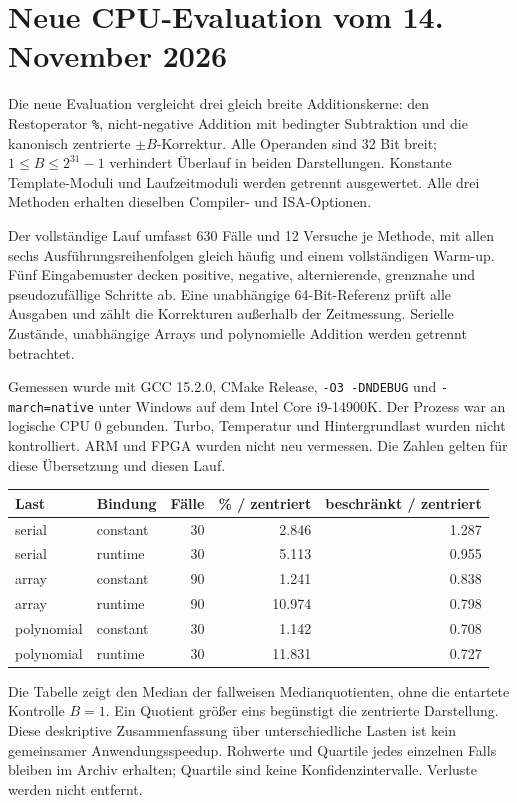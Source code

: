 \section{Neue CPU-Evaluation vom 14. November 2026}
\label{sec:neuevaluation}
Die neue Evaluation vergleicht drei gleich breite Additionskerne: den
Restoperator \texttt{\%}, nicht-negative Addition mit bedingter Subtraktion
und die kanonisch zentrierte $\pm B$-Korrektur. Alle Operanden sind 32 Bit
breit; $1\le B\le 2^{31}-1$ verhindert Überlauf in beiden Darstellungen.
Konstante Template-Moduli und Laufzeitmoduli werden getrennt ausgewertet.
Alle drei Methoden erhalten dieselben Compiler- und ISA-Optionen.

Der vollständige Lauf umfasst 630 Fälle und 12 Versuche
je Methode, mit allen sechs Ausführungsreihenfolgen gleich häufig und
einem vollständigen Warm-up. Fünf Eingabemuster decken positive, negative,
alternierende, grenznahe und pseudozufällige Schritte ab. Eine unabhängige
64-Bit-Referenz prüft alle Ausgaben und zählt die Korrekturen außerhalb
der Zeitmessung. Serielle Zustände, unabhängige Arrays und polynomielle
Addition werden getrennt betrachtet.

Gemessen wurde mit GCC 15.2.0, CMake Release, \texttt{-O3 -DNDEBUG}
und \texttt{-march=native} unter Windows auf dem Intel Core i9-14900K.
Der Prozess war an logische CPU 0 gebunden. Turbo, Temperatur und
Hintergrundlast wurden nicht kontrolliert. ARM und FPGA wurden nicht neu vermessen.
Die Zahlen gelten für diese Übersetzung und diesen Lauf.

\begin{center}\small
\begin{tabular}{llrrr}\toprule
Last & Bindung & Fälle & \% / zentriert & beschränkt / zentriert \\\midrule
serial & constant & 30 & 2.846 & 1.287 \\
serial & runtime & 30 & 5.113 & 0.955 \\
array & constant & 90 & 1.241 & 0.838 \\
array & runtime & 90 & 10.974 & 0.798 \\
polynomial & constant & 30 & 1.142 & 0.708 \\
polynomial & runtime & 30 & 11.831 & 0.727 \\
\bottomrule\end{tabular}\end{center}
Die Tabelle zeigt den Median der fallweisen Medianquotienten, ohne
die entartete Kontrolle $B=1$. Ein Quotient größer eins begünstigt die
zentrierte Darstellung. Diese deskriptive Zusammenfassung über unterschiedliche
Lasten ist kein gemeinsamer Anwendungsspeedup. Rohwerte und Quartile
jedes einzelnen Falls bleiben im Archiv erhalten; Quartile sind keine
Konfidenzintervalle. Verluste werden nicht entfernt.

